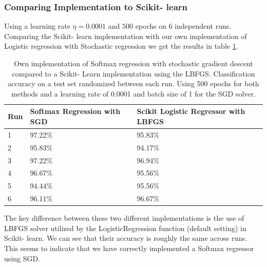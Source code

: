 \documentclass[11pt,a4paper,titlepage]{article}
\begin{document}
\subsubsection{Comparing Implementation to Scikit- learn}
Using a learning rate $\eta = 0.0001$ and $500$ epochs on $6$ independent runs. Comparing the Scikit- learn implementation with our own implementation of Logistic regression with Stochastic regression we get the results in table \ref{Softmax_sci_v_us}.
\begin{table}[H]
\caption[Classification accuracy comparison to Scikit- Learn]{Own implementation of Softmax regression with stochastic gradient descent compared to a Scikit- Learn implementation using the LBFGS. Classification accuracy on a test set randomized between each run. Using 500 epochs for both methods and a learning rate of 0.0001 and batch size of 1 for the SGD solver.}
\centering
\begin{tabular}{|l|l|l|}
\hline
Run & Softmax Regression with SGD & Scikit Logistic Regressor with LBFGS \\ \hline
1   & 97.22\%                     & 95.83\%                              \\ \hline
2   & 95.83\%                     & 94.17\%                              \\ \hline
3   & 97.22\%                     & 96.94\%                              \\ \hline
4   & 96.67\%                     & 95.56\%                              \\ \hline
5   & 94.44\%                     & 95.56\%                              \\ \hline
6   & 96.11\%                     & 96.67\%                              \\ \hline
\end{tabular}\label{Softmax_sci_v_us}
\end{table}
The key difference between these two different implementations is the use of LBFGS solver utilized by the LogisticRegression function (default setting) in Scikit- learn. We can see that their accuracy is roughly the same across runs. This seems to indicate that we have correctly implemented a Softmax regressor using SGD.
\end{document}
